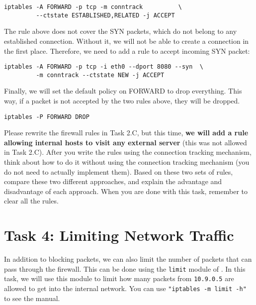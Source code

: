 \begin{lstlisting}
iptables -A FORWARD -p tcp -m conntrack          \
         --ctstate ESTABLISHED,RELATED -j ACCEPT
\end{lstlisting}


The rule above does not cover the SYN packets, which do not belong to 
any established connection. Without it, we will not be able to 
create a connection in the first place. Therefore, we need to 
add a rule to accept incoming SYN packet: 

\begin{lstlisting}
iptables -A FORWARD -p tcp -i eth0 --dport 8080 --syn  \
         -m conntrack --ctstate NEW -j ACCEPT 
\end{lstlisting}

Finally, we will set the default policy on FORWARD to drop
everything. This way, if a packet is not accepted by the two
rules above, they will be dropped. 

\begin{lstlisting}
iptables -P FORWARD DROP
\end{lstlisting}


Please rewrite the firewall rules in Task 2.C, but this time,
\textbf{we will add a rule allowing internal hosts to visit any 
external server} (this was not allowed in Task 2.C). 
After you write the rules using the connection tracking mechanism, 
think about how to do it without using the connection tracking
mechanism (you do not need to actually implement them). 
Based on these two sets of rules, 
compare these two different approaches, and 
explain the advantage and disadvantage of each approach. 
When you are done with this task, remember to clear all the rules. 



\section{Task 4: Limiting Network Traffic}

In addition to blocking packets, we can also 
limit the number of packets that can pass through the firewall. 
This can be done using the \texttt{limit} module of \iptables.
In this task, we will use this module to limit how many packets 
from \texttt{10.9.0.5} are allowed to get into the internal network. 
You can use \texttt{"iptables -m limit -h"} to see the manual.  

